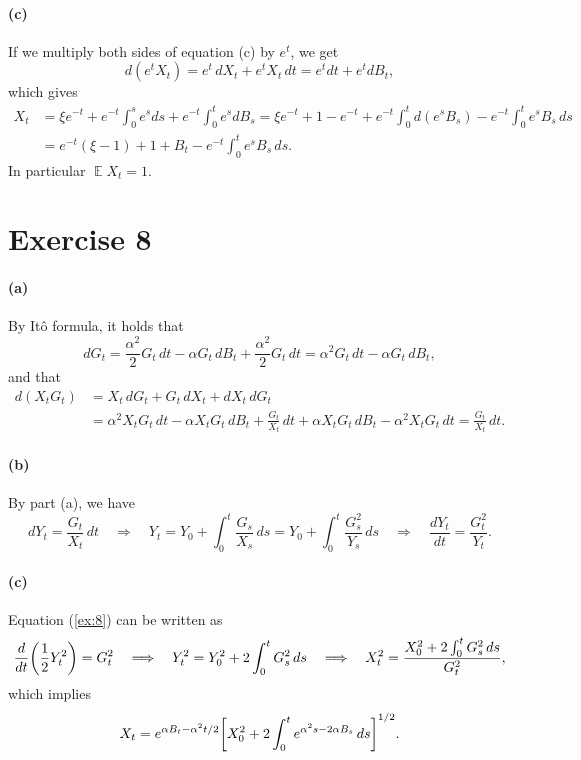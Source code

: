 \documentclass[a4paper,11pt]{article}
\theoremstyle{definition}
\theoremstyle{plain}
\theoremstyle{remark}
\DeclarePairedDelimiter{\parr}{(}{)}
\DeclarePairedDelimiter{\parq}{[}{]}
\DeclareMathOperator*{\expval}{\mathbb{E}}
\begin{document}
\paragraph*{(c)}

If we multiply both sides of equation (c) by $e^t$, we get
$$
d(e^tX_t) = e^t\,dX_t + e^tX_t\,dt = e^tdt + e^tdB_t,
$$
which gives
\begin{align*}
X_t & = \xi e^{-t} + e^{-t}\int_0^se^sds + e^{-t}\int_0^te^sdB_s
= \xi e^{-t} + 1 - e^{-t} + e^{-t}\int_0^td(e^sB_s) - e^{-t}\int_0^t e^sB_s\,ds \\ & = e^{-t}(\xi -1) + 1 + B_t - e^{-t}\int_0^t e^sB_s\,ds.
\end{align*}
In particular $\expval X_t = 1$.

\section*{Exercise 8}

\paragraph*{(a)}

By It\^o formula, it holds that
$$
dG_t = \frac{\alpha^2}{2}G_t\,dt - \alpha G_t\,dB_t + \frac{\alpha^2}{2}G_t\,dt = \alpha^2 G_t\,dt - \alpha G_t\,dB_t,
$$
and that
\begin{align*}
d(X_tG_t) & = X_t\,dG_t + G_t\,dX_t + dX_t\,dG_t \\ & = \alpha^2X_tG_t\,dt - \alpha X_tG_t\,dB_t + \frac{G_t}{X_t}\,dt + \alpha X_tG_t\,dB_t -\alpha^2X_tG_t\,dt = \frac{G_t}{X_t}\,dt.
\end{align*}

\paragraph*{(b)} By part (a), we have
\begin{equation}
dY_t = \frac{G_t}{X_t}\,dt \quad\Longrightarrow\quad Y_t = Y_0 + \int_0^t \frac{G_s}{X_s}\,ds = Y_0 + \int_0^t \frac{G_s^2}{Y_s}\,ds \quad\Longrightarrow\quad \frac{dY_t}{dt} = \frac{G_t^2}{Y_t}.
\label{ex:8}
\end{equation}

\paragraph*{(c)}
Equation (\ref{ex:8}) can be written as 
$$
\frac{d}{dt}\parr*{\frac{1}{2}Y_t^2} = G_t^2 \quad\Longrightarrow\quad Y_t^2 = Y_0^2 + 2\int_0^tG_s^2\,ds \quad\Longrightarrow\quad X_t^2 = \frac{X_0^2 + 2\int_0^tG_s^2\,ds}{G_t^2},
$$
which implies
$$
X_t = e^{\alpha B_t-\alpha^2t/2}\parq*{X_0^2+2\int_0^te^{\alpha^2s-2\alpha B_s}\,ds}^{1/2}.
$$
\end{document}
